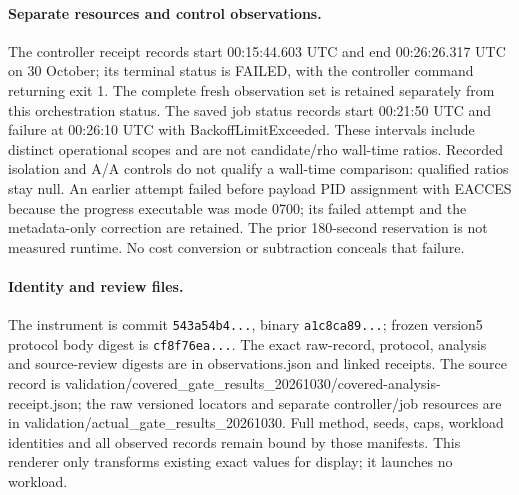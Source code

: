 \paragraph{Separate resources and control observations.} The controller receipt records start 00:15:44.603 UTC and end 00:26:26.317 UTC on 30 October; its terminal status is FAILED, with the controller command returning exit 1. The complete fresh observation set is retained separately from this orchestration status. The saved job status records start 00:21:50 UTC and failure at 00:26:10 UTC with BackoffLimitExceeded. These intervals include distinct operational scopes and are not candidate/rho wall-time ratios. Recorded isolation and A/A controls do not qualify a wall-time comparison: qualified ratios stay null. An earlier attempt failed before payload PID assignment with EACCES because the progress executable was mode 0700; its failed attempt and the metadata-only correction are retained. The prior 180-second reservation is not measured runtime. No cost conversion or subtraction conceals that failure.

\paragraph{Identity and review files.} The instrument is commit \texttt{543a54b4...}, binary \texttt{a1c8ca89...}; frozen version5 protocol body digest is \texttt{cf8f76ea...}. The exact raw-record, protocol, analysis and source-review digests are in observations.json and linked receipts. The source record is validation/covered\_gate\_results\_20261030/covered-analysis-receipt.json; the raw versioned locators and separate controller/job resources are in validation/actual\_gate\_results\_20261030. Full method, seeds, caps, workload identities and all observed records remain bound by those manifests. This renderer only transforms existing exact values for display; it launches no workload.

